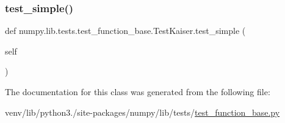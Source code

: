 \mbox{\label{classnumpy_1_1lib_1_1tests_1_1test__function__base_1_1TestKaiser_ada37f565af97797109d26575174a13e9}} 
\subsubsection{\texorpdfstring{test\+\_\+simple()}{test\_simple()}}
{\footnotesize\ttfamily def numpy.\+lib.\+tests.\+test\+\_\+function\+\_\+base.\+Test\+Kaiser.\+test\+\_\+simple (\begin{DoxyParamCaption}\item[{}]{self }\end{DoxyParamCaption})}



The documentation for this class was generated from the following file\+:\begin{DoxyCompactItemize}
\item 
venv/lib/python3./site-\/packages/numpy/lib/tests/\hyperlink{lib_2tests_2test__function__base_8py}{test\+\_\+function\+\_\+base.\+py}\end{DoxyCompactItemize}
